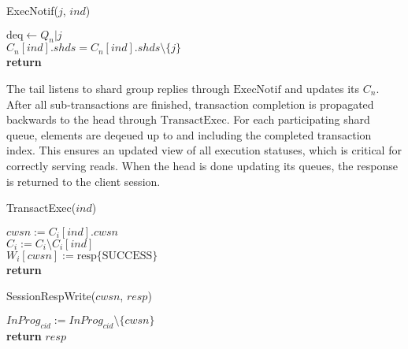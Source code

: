 \documentclass{article}
\begin{document}
\begin{procedure}[H]
  \caption{ExecNotif($j$, $ind$)}
  $\text{deq} \leftarrow Q_n|j$\\
  $C_n[ind].shds = C_n[ind].shds\setminus\{ j\}$\\
  \textbf{return}
\end{procedure}\hfill 
\noindent\par The tail listens to shard group replies through $\text{ExecNotif}$ and updates its $C_{n}$. After all sub-transactions are finished, transaction completion is propagated backwards to the head through $\text{TransactExec}$. For each participating shard queue, elements are deqeued up to and including the completed transaction index. This ensures an updated view of all execution statuses, which is critical for correctly serving reads. When the head is done updating its queues, the response is returned to the client session.\\
\begin{procedure}[H]
  \caption{TransactExec($ind$)}
  $cwsn := C_i[ind].cwsn$\\
  $C_i := C_i \setminus C_i[ind]$\\ 
  $W_i[cwsn] := \text{resp}\{\text{SUCCESS}\}$\\
  \textbf{return}
\end{procedure}
\begin{procedure}[H]
  \caption{SessionRespWrite($cwsn$, $resp$)}
  $InProg_{cid} := InProg_{cid}\setminus \{cwsn\}$\\
  \textbf{return} $resp$
\end{procedure}
\newpage
\end{document}
